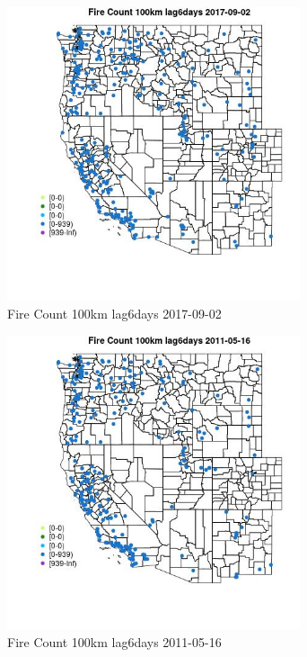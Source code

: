 \begin{figure} 
\centering  
\includegraphics[width=0.77\textwidth]{Code_Outputs/Report_ML_input_PM25_Step4_part_e_de_duplicated_aves_compiled_2019-05-21wNAs_MapObsFire_Count_100km_lag6days2017-09-02.jpg} 
\caption{\label{fig:Report_ML_input_PM25_Step4_part_e_de_duplicated_aves_compiled_2019-05-21wNAsMapObsFire_Count_100km_lag6days2017-09-02}Fire Count 100km lag6days 2017-09-02} 
\end{figure} 
 

\begin{figure} 
\centering  
\includegraphics[width=0.77\textwidth]{Code_Outputs/Report_ML_input_PM25_Step4_part_e_de_duplicated_aves_compiled_2019-05-21wNAs_MapObsFire_Count_100km_lag6days2011-05-16.jpg} 
\caption{\label{fig:Report_ML_input_PM25_Step4_part_e_de_duplicated_aves_compiled_2019-05-21wNAsMapObsFire_Count_100km_lag6days2011-05-16}Fire Count 100km lag6days 2011-05-16} 
\end{figure} 
 

